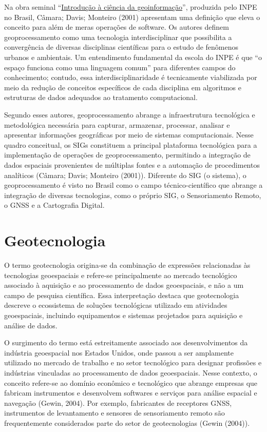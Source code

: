 \documentclass[
  letterpaper,
  DIV=11,
  numbers=noendperiod]{scrreprt}
\begin{document}
Na obra seminal
``\href{http://www.dpi.inpe.br/gilberto/livro/introd/index.html}{Introdução
à ciência da geoinformação}'', produzida pelo INPE no Brasil, Câmara;
Davis; Monteiro (2001) apresentam uma definição que eleva o conceito
para além de meras operações de software. Os autores definem
geoprocessamento como uma tecnologia interdisciplinar que possibilita a
convergência de diversas disciplinas científicas para o estudo de
fenômenos urbanos e ambientais. Um entendimento fundamental da escola do
INPE é que ``o espaço funciona como uma linguagem comum'' para
diferentes campos do conhecimento; contudo, essa interdisciplinaridade é
tecnicamente viabilizada por meio da redução de conceitos específicos de
cada disciplina em algoritmos e estruturas de dados adequados ao
tratamento computacional.

Segundo esses autores, geoprocessamento abrange a infraestrutura
tecnológica e metodológica necessária para capturar, armazenar,
processar, analisar e apresentar informações geográficas por meio de
sistemas computacionais. Nesse quadro conceitual, os SIGs constituem a
principal plataforma tecnológica para a implementação de operações de
geoprocessamento, permitindo a integração de dados espaciais
provenientes de múltiplas fontes e a automação de procedimentos
analíticos (Câmara; Davis; Monteiro (2001)). Diferente do SIG (o
sistema), o geoprocessamento é visto no Brasil como o campo
técnico-científico que abrange a integração de diversas tecnologias,
como o próprio SIG, o Sensoriamento Remoto, o GNSS e a Cartografia
Digital.

\section{Geotecnologia}\label{geotecnologia}

O termo geotecnologia origina-se da combinação de expressões
relacionadas às tecnologias geoespaciais e refere-se principalmente ao
mercado tecnológico associado à aquisição e ao processamento de dados
geoespaciais, e não a um campo de pesquisa científica. Essa
interpretação destaca que geotecnologia descreve o ecossistema de
soluções tecnológicas utilizado em atividades geoespaciais, incluindo
equipamentos e sistemas projetados para aquisição e análise de dados.

O surgimento do termo está estreitamente associado aos desenvolvimentos
da indústria geoespacial nos Estados Unidos, onde passou a ser
amplamente utilizado no mercado de trabalho e no setor tecnológico para
designar profissões e indústrias vinculadas ao processamento de dados
geoespaciais. Nesse contexto, o conceito refere-se ao domínio econômico
e tecnológico que abrange empresas que fabricam instrumentos e
desenvolvem softwares e serviços para análise espacial e navegação
(Gewin, 2004). Por exemplo, fabricantes de receptores GNSS, instrumentos
de levantamento e sensores de sensoriamento remoto são frequentemente
considerados parte do setor de geotecnologias (Gewin (2004)).
\end{document}
